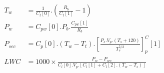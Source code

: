 \begin{align*}
T_w &= \frac{1}
               {C_t[0]}.\left( 
          \frac{R_b}
               {C_t[1]} - 1 \right)	\\
P_w &= C_{pw}[0] .P_b . \frac{C_{pw}[1]}{R_b} \\  
P_{sec} &= C_p[0]. ( T_w - T_t).\left[
          \frac{P_s.V_p. (T_s +120)}
               {T_s^{5/2} }
          \right]^C_p[1] \\
LWC &= 1000 \times 
         \frac{ P_w - P_{sec} }
              {C_l[0].V_p.
               \left[ C_l[1] + C_l[2].\left(T_w - T_s \right)
               \right] } \\  
\end{align*}
